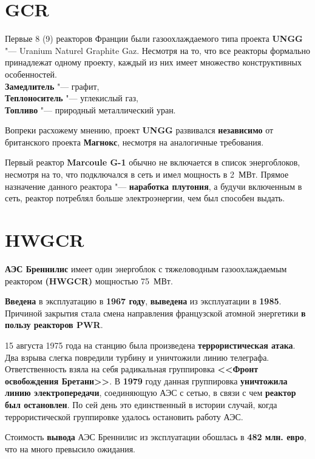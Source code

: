 


	
\section{GCR}

Первые 8 (9) реакторов Франции были газоохлаждаемого типа проекта \textbf{UNGG} "--- Uranium Naturel Graphite Gaz. Несмотря на то, что все реакторы формально принадлежат одному проекту, каждый из них имеет множество конструктивных особенностей.\\
\textbf{Замедлитель} "--- графит,\\
\textbf{Теплоноситель} "--- углекислый газ,\\
\textbf{Топливо} "--- природный металлический уран.

Вопреки расхожему мнению, проект \textbf{UNGG} развивался \textbf{независимо} от британского проекта \textbf{Магнокс}, несмотря на аналогичные требования.

Первый реактор \textbf{Marcoule G-1} обычно не включается в список энергоблоков, несмотря на то, что подключался в сеть и имел мощность в 2~МВт. Прямое назначение данного реактора "--- \textbf{наработка плутония}, а будучи включенным в сеть, реактор потреблял больше электроэнергии, чем был способен выдать.
	
\section{HWGCR}

\textbf{АЭС Бреннилис} имеет один энергоблок с тяжеловодным газоохлаждаемым реактором \textbf{(HWGCR)} мощностью 75~МВт.

\textbf{Введена} в эксплуатацию в \textbf{1967 году}, \textbf{выведена} из эксплуатации в \textbf{1985}. Причиной закрытия стала смена направления французской атомной энергетики \textbf{в пользу реакторов PWR}.

15 августа 1975 года на станцию была произведена \textbf{террористическая атака}. Два взрыва слегка повредили турбину и уничтожили линию телеграфа. Ответственность взяла на себя радикальная группировка \textbf{<<Фронт освобождения Бретани>>}. В \textbf{1979} году данная группировка \textbf{уничтожила линию электропередачи}, соединяющую АЭС с сетью, в связи с чем \textbf{реактор был остановлен}. По сей день это единственный в истории случай, когда террористической группировке удалось остановить работу АЭС.

Стоимость \textbf{вывода} АЭС Бреннилис из эксплуатации обошлась в \textbf{482 млн. евро}, что на много превысило ожидания.

